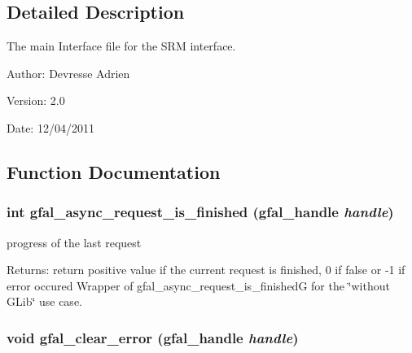 \subsection{Detailed Description}
The main Interface file for the SRM interface. 

\begin{Desc}
\item[Author:]Devresse Adrien \end{Desc}
\begin{Desc}
\item[Version:]2.0 \end{Desc}
\begin{Desc}
\item[Date:]12/04/2011 \end{Desc}


\subsection{Function Documentation}
\subsubsection{\setlength{\rightskip}{0pt plus 5cm}int gfal\_\-async\_\-request\_\-is\_\-finished (gfal\_\-handle {\em handle})}\label{gfal__common__interface_8h_ce6fcac8e92ad2e1d699eed2ce74a257}


progress of the last request 

\begin{Desc}
\item[Returns:]return positive value if the current request is finished, 0 if false or -1 if error occured Wrapper of gfal\_\-async\_\-request\_\-is\_\-finished\-G for the \char`\"{}without GLib\char`\"{} use case. \end{Desc}
\subsubsection{\setlength{\rightskip}{0pt plus 5cm}void gfal\_\-clear\_\-error (gfal\_\-handle {\em handle})}\label{gfal__common__interface_8h_4ca376cf47166fabd46a45fccb863ebe}


